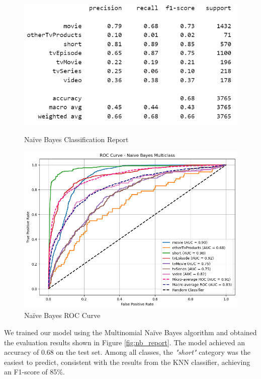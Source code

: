 \documentclass[10pt]{article}
\begin{document}
\begin{figure}[ht]
    \centering
    \begin{minipage}{0.48\textwidth}
        \centering
        \includegraphics[width=\linewidth]{Report_naiveB.png}
        \caption{Naïve Bayes Classification Report}
        \label{fig:nb_report}
    \end{minipage}
    \hfill
    \begin{minipage}{0.48\textwidth}
        \centering
        \includegraphics[width=\linewidth]{rocnb.png}
        \caption{ Naïve Bayes ROC Curve}
        \label{fig:nb_roc}
   \end{minipage}
\end{figure}
We trained our model using the Multinomial Naïve Bayes algorithm and obtained the evaluation results shown in Figure \ref{fig:nb_report}. The model achieved an accuracy of 0.68 on the test set. Among all classes, the \textit{"short"} category was the easiest to predict, consistent with the results from the KNN classifier, achieving an F1-score of 85\%. \newline
\end{document}
